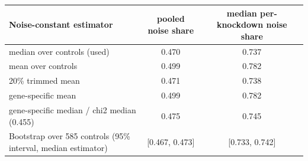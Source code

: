 \begin{tabular}{lcc}
\toprule
Noise-constant estimator & pooled noise share & median per-knockdown noise share \\
\midrule
median over controls (used) & 0.470 & 0.737 \\
mean over controls & 0.499 & 0.782 \\
20\% trimmed mean & 0.471 & 0.738 \\
gene-specific mean & 0.499 & 0.782 \\
gene-specific median / chi2 median (0.455) & 0.475 & 0.745 \\
Bootstrap over 585 controls (95\% interval, median estimator) & [0.467, 0.473] & [0.733, 0.742] \\
\bottomrule
\end{tabular}